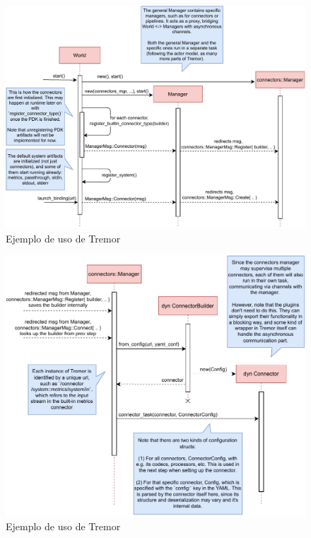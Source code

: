 \begin{figure}
    \centering
    \includegraphics[width=\textwidth]{./Imagenes/registering.pdf}
    \caption{Ejemplo de uso de Tremor}%
    \label{fig:example_tremor}
\end{figure}

\begin{figure}
    \centering
    \includegraphics[width=\textwidth]{./Imagenes/initializing.pdf}
    \caption{Ejemplo de uso de Tremor}%
    \label{fig:example_tremor}
\end{figure}

